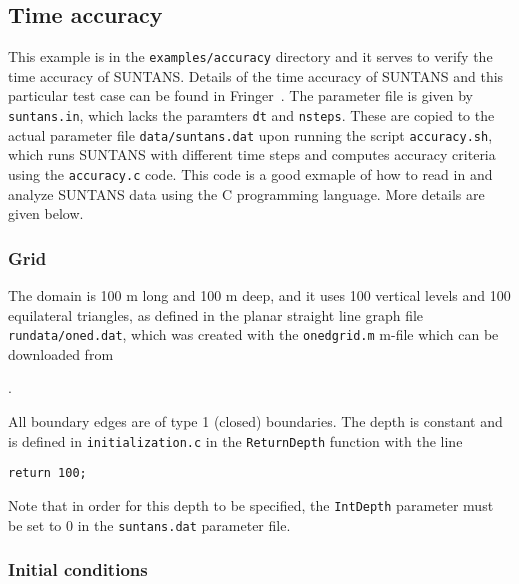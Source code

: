 \documentclass[12pt,oneside]{article}
\begin{document}
\subsection{Time accuracy} \label{sec:timeaccuracy}

This example is in the \verb+examples/accuracy+ directory and it
serves to verify the time accuracy of SUNTANS.  Details of the time accuracy
of SUNTANS and this particular test case can be found in Fringer\etal~\cite{FRINGER[2005]}.
The parameter file is given by
\verb+suntans.in+, which lacks the paramters \verb+dt+ and \verb+nsteps+.  These
are copied to the actual parameter file \verb+data/suntans.dat+ upon running the
script \verb+accuracy.sh+, which runs SUNTANS with different time steps and computes
accuracy criteria using the \verb+accuracy.c+ code.  This code is a good exmaple
of how to read in and analyze SUNTANS data using the C programming language.  More
details are given below.

\subsubsection{Grid}

The domain is 100 m long and 100 m deep, and it
uses 100 vertical levels and 100 equilateral triangles, as defined in the planar
straight line graph file \verb+rundata/oned.dat+, which was created with the
\verb+onedgrid.m+ m-file which can be downloaded from 

\medskip
\noindent
\mfiledownload.

\medskip
\noindent
All boundary edges are of type 1 (closed) boundaries.
The depth is constant and is defined in \verb+initialization.c+ in the 
\verb+ReturnDepth+ function with the line
\begin{verbatim}
return 100;
\end{verbatim}
Note that in order for this depth to be specified, the \verb+IntDepth+ parameter must
be set to 0 in the \verb+suntans.dat+ parameter file.

\subsubsection{Initial conditions}
\end{document}
